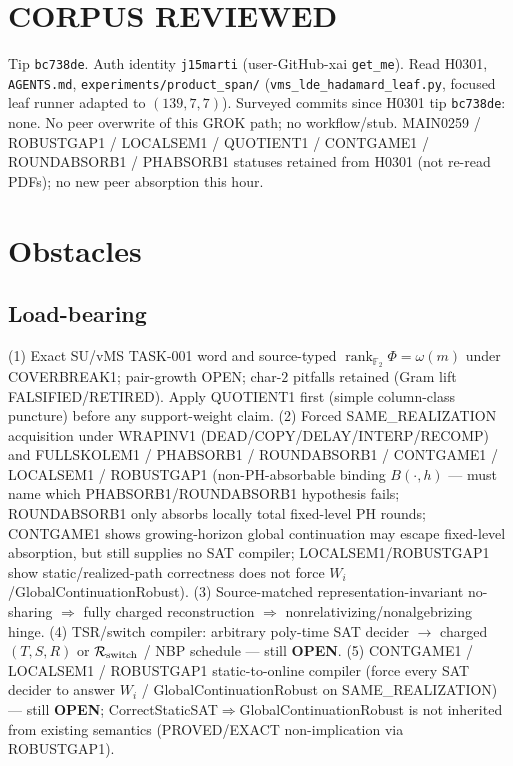\documentclass[11pt]{article}
\begin{document}
\section*{CORPUS REVIEWED}
Tip \texttt{bc738de}. Auth identity \texttt{j15marti} (user-GitHub-xai \texttt{get\_me}).
Read H0301,
\texttt{AGENTS.md}, \texttt{experiments/product\_span/}
(\texttt{vms\_lde\_hadamard\_leaf.py}, focused leaf runner adapted to $(139,7,7)$).
Surveyed commits since H0301 tip \texttt{bc738de}: none.
No peer overwrite of this GROK path; no workflow/stub.
MAIN0259 / ROBUSTGAP1 / LOCALSEM1 / QUOTIENT1 / CONTGAME1 / ROUNDABSORB1 / PHABSORB1
statuses retained from H0301 (not re-read PDFs); no new peer absorption this hour.

\section*{Obstacles}
\subsection*{Load-bearing}
(1) Exact SU/vMS TASK-001 word and source-typed
$\operatorname{rank}_{\mathbb F_2}\Phi=\omega(m)$ under COVERBREAK1; pair-growth OPEN;
char-$2$ pitfalls retained (Gram lift FALSIFIED/RETIRED). Apply QUOTIENT1 first
(simple column-class puncture) before any support-weight claim.
(2) Forced SAME\_REALIZATION acquisition under WRAPINV1
(DEAD/COPY/DELAY/INTERP/RECOMP) and FULLSKOLEM1 / PHABSORB1 / ROUNDABSORB1 / CONTGAME1 /
LOCALSEM1 / ROBUSTGAP1
(non-PH-absorbable binding $B(\cdot,h)$ --- must name which PHABSORB1/ROUNDABSORB1
hypothesis fails; ROUNDABSORB1 only absorbs locally total fixed-level PH rounds;
CONTGAME1 shows growing-horizon global continuation may escape fixed-level absorption,
but still supplies no SAT compiler; LOCALSEM1/ROBUSTGAP1 show static/realized-path
correctness does not force $W_i$/GlobalContinuationRobust).
(3) Source-matched representation-invariant no-sharing $\Rightarrow$ fully charged reconstruction
$\Rightarrow$ nonrelativizing/nonalgebrizing hinge.
(4) TSR/switch compiler: arbitrary poly-time SAT decider $\to$ charged $(T,S,R)$ or
$\mathcal R_{\rm switch}$ / NBP schedule --- still \textbf{OPEN}.
(5) CONTGAME1 / LOCALSEM1 / ROBUSTGAP1 static-to-online compiler (force every SAT decider to
answer $W_i$ / GlobalContinuationRobust on SAME\_REALIZATION) --- still \textbf{OPEN};
CorrectStaticSAT$\Rightarrow$GlobalContinuationRobust is not inherited from existing semantics
(PROVED/EXACT non-implication via ROBUSTGAP1).
\end{document}
